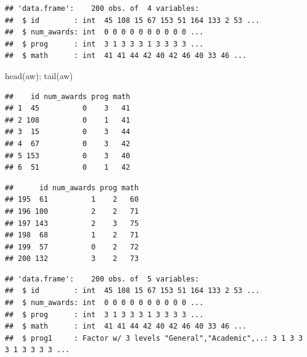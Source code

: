 \documentclass[
]{book}
\makeatletter
\newenvironment{Shaded}{\begin{snugshade}}{\end{snugshade}}
\newcommand{\AttributeTok}[1]{\textcolor[rgb]{0.61,0.61,0.61}{#1}}
\newcommand{\CommentTok}[1]{\textcolor[rgb]{0.37,0.37,0.37}{\textit{#1}}}
\newcommand{\DecValTok}[1]{\textcolor[rgb]{0.06,0.06,0.06}{#1}}
\newcommand{\FunctionTok}[1]{\textcolor[rgb]{0,0,0}{#1}}
\newcommand{\NormalTok}[1]{#1}
\newcommand{\OtherTok}[1]{\textcolor[rgb]{0.37,0.37,0.37}{#1}}
\newcommand{\SpecialCharTok}[1]{\textcolor[rgb]{0,0,0}{#1}}
\newcommand{\StringTok}[1]{\textcolor[rgb]{0.5,0.5,0.5}{#1}}
\newenvironment{kframe}{%
\medskip{}
\setlength{\fboxsep}{.8em}
 \def\at@end@of@kframe{}%
 \ifinner\ifhmode%
  \def\at@end@of@kframe{\end{minipage}}%
  \begin{minipage}{\columnwidth}%
 \fi\fi%
 \def\FrameCommand##1{\hskip\@totalleftmargin \hskip-\fboxsep
 \colorbox{shadecolor}{##1}\hskip-\fboxsep
     \hskip-\linewidth \hskip-\@totalleftmargin \hskip\columnwidth}%
 \MakeFramed {\advance\hsize-\width
   \@totalleftmargin\z@ \linewidth\hsize
   \@setminipage}}%
 {\par\unskip\endMakeFramed%
 \at@end@of@kframe}
\renewenvironment{Shaded}{\begin{kframe}}{\end{kframe}}
\makeatother
\begin{document}
\begin{verbatim}
## 'data.frame':    200 obs. of  4 variables:
##  $ id        : int  45 108 15 67 153 51 164 133 2 53 ...
##  $ num_awards: int  0 0 0 0 0 0 0 0 0 0 ...
##  $ prog      : int  3 1 3 3 3 1 3 3 3 3 ...
##  $ math      : int  41 41 44 42 40 42 46 40 33 46 ...
\end{verbatim}

\begin{Shaded}
\begin{Highlighting}[]
\FunctionTok{head}\NormalTok{(aw); }\FunctionTok{tail}\NormalTok{(aw)}
\end{Highlighting}
\end{Shaded}

\begin{verbatim}
##    id num_awards prog math
## 1  45          0    3   41
## 2 108          0    1   41
## 3  15          0    3   44
## 4  67          0    3   42
## 5 153          0    3   40
## 6  51          0    1   42
\end{verbatim}

\begin{verbatim}
##      id num_awards prog math
## 195  61          1    2   60
## 196 100          2    2   71
## 197 143          2    3   75
## 198  68          1    2   71
## 199  57          0    2   72
## 200 132          3    2   73
\end{verbatim}

\begin{Shaded}
\end{Shaded}

\begin{verbatim}
## 'data.frame':    200 obs. of  5 variables:
##  $ id        : int  45 108 15 67 153 51 164 133 2 53 ...
##  $ num_awards: int  0 0 0 0 0 0 0 0 0 0 ...
##  $ prog      : int  3 1 3 3 3 1 3 3 3 3 ...
##  $ math      : int  41 41 44 42 40 42 46 40 33 46 ...
##  $ prog1     : Factor w/ 3 levels "General","Academic",..: 3 1 3 3 3 1 3 3 3 3 ...
\end{verbatim}
\end{document}
